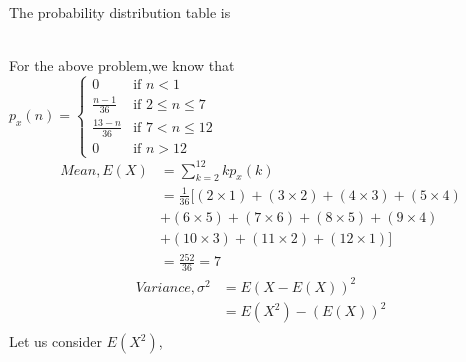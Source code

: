 \documentclass[journal,12pt,twocolumn]{IEEEtran}
\begin{document}
The probability distribution table is 
\renewcommand{\arraystretch}{2}
\begin{table}[hbt!]
\end{table}\\
For the above problem,we know that\\
$p_x(n) = 
\left\{
	\begin{array}{ll}
		0  & \mbox{if } n < 1 \\
		\displaystyle\frac{n-1}{36} & \mbox{if } 2\leq n \leq 7\\
		\displaystyle\frac{13-n}{36} & \mbox{if } 7<n \leq 12\\
		0 & \mbox{if } n > 12
	\end{array}
\right.$
\begin{align}
    Mean,E(X)& =\sum_{k=2}^{12} kp_x(k)\\
    & = \displaystyle\frac{1}{36}[(2\times1)+(3\times2)+(4\times3)+(5\times4)\\
    &+(6\times5)+(7\times6)+(8\times5)+(9\times4)\\
    &+(10\times3)+(11\times2)+(12\times1)]\\
    & = \frac{252}{36}=7
\end{align} 
\begin{align}
    Variance,\sigma^2 &= E(X-E(X))^2\\
    &= E(X^2) - (E(X))^2\\
\end{align}
Let us consider $E(X^2)$,
\end{document}
